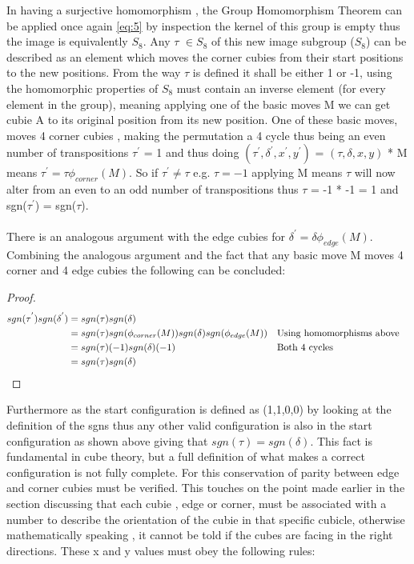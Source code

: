 \documentclass{article}
\begin{document}
 In having a surjective homomorphism , the Group Homomorphism Theorem can be applied once again \eqref{eq:5} by inspection the kernel of this group is empty thus the image is equivalently $S_{8}$. Any $\tau$ $\in S_{8}$ of this new image subgroup ($S_8$) can be described as an element which moves the corner cubies from their start positions to the new positions. From the way $\tau$ is defined it shall be either 1 or -1, using the homomorphic properties of $S_{8}$ must contain an inverse element (for every element in the group), meaning applying one of the basic moves M we can get cubie A to its original position from its new position. One of these basic moves, moves 4 corner cubies , making the permutation a 4 cycle thus being an even number of transpositions $\tau^{'}$ = 1 and thus doing $(\tau^{'} ,\delta^{'} , x^{'} , y^{'} )$ = $(\tau,\delta, x, y)$ * M means $\tau^{'} = \tau\phi_{corner}(M)$. So if $\tau^{'} \neq \tau$ e.g. $\tau = -1$ applying M means $\tau$ will now alter from an even to an odd number of transpositions thus $\tau$ = -1 * -1 = 1 and sgn($\tau^{'}$) = sgn($\tau$).

\paragraph*{}


There is an analogous argument with the edge cubies for $\delta^{'} = \delta\phi_{edge}(M) $. Combining the analogous argument and the fact that any basic move M moves 4 corner and 4 edge cubies the following can be concluded:
\begin{proof}
\begin{align*}
sgn(\tau^{'}) sgn(\delta^{'}) &= sgn(\tau)sgn(\delta) \\ 
		&= sgn(\tau)sgn(\phi_{corner}(M))sgn(\delta)sgn(\phi_{edge}(M))&&\text{Using homomorphisms above}  \\
        &= sgn(\tau)(-1)sgn(\delta)(-1) &&\text{Both 4 cycles}  \\
        &=  sgn(\tau)sgn(\delta)  &&\qedhere
\end{align*}
\end{proof}
Furthermore as the start configuration is defined as (1,1,0,0) by looking at the definition of the sgns thus any other valid configuration is also in the start configuration as shown above giving that $sgn(\tau) = sgn(\delta)$. 
This fact is fundamental in cube theory, but a full definition of what makes a correct configuration is not fully complete. For this conservation of parity between edge and corner cubies must be verified. This touches on the point made earlier in the section discussing that each cubie , edge or corner, must be associated with a number to describe the orientation of the cubie in that specific cubicle, otherwise mathematically speaking , it cannot be told if the cubes are facing in the right directions. These x and y values must obey the following rules: 
\end{document}
